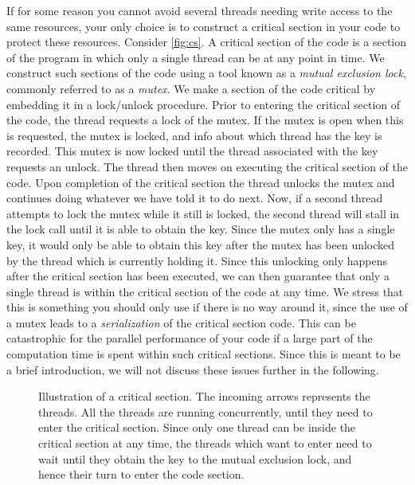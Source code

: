 If for some reason you cannot avoid several threads needing write access to the
same resources, your only choice is to construct a critical section in your code
to protect these resources. Consider \autoref{fig:cs}. A critical section of the
code is a section of the program in which only a single thread can be at any
point in time. We construct such sections of the code using a tool known as a
\emph{mutual exclusion lock}, commonly referred to as a \emph{mutex}. We make a
section of the code critical by embedding it in a lock/unlock procedure. Prior
to entering the critical section of the code, the thread requests a lock of the
mutex. If the mutex is open when this is requested, the mutex is locked, and
info about which thread has the key is recorded. This mutex is now locked until
the thread associated with the key requests an unlock. The thread then moves on
executing the critical section of the code. Upon completion of the critical
section the thread unlocks the mutex and continues doing whatever we have told
it to do next. Now, if a second thread attempts to lock the mutex while it still
is locked, the second thread will stall in the lock call until it is able to
obtain the key. Since the mutex only has a single key, it would only be able to
obtain this key after the mutex has been unlocked by the thread which is
currently holding it. Since this unlocking only happens after the critical
section has been executed, we can then guarantee that only a single thread is
within the critical section of the code at any time. We stress that this is
something you should only use if there is no way around it, since the use of a
mutex leads to a \emph{serialization} of the critical section code. This can be
catastrophic for the parallel performance of your code if a large part of the
computation time is spent within such critical sections. Since this is meant to
be a brief introduction, we will not discuss these issues further in the
following.

\begin{figure}
  \centering
  
  \caption{
    Illustration of a critical section. The incoming arrows represents the
    threads. All the threads are running concurrently, until they need to enter
    the critical section. Since only one thread can be inside the critical
    section at any time, the threads which want to enter need to wait until they
    obtain the key to the mutual exclusion lock, and hence their turn to enter
    the code section.
  }
  \label{fig:cs}
\end{figure}


